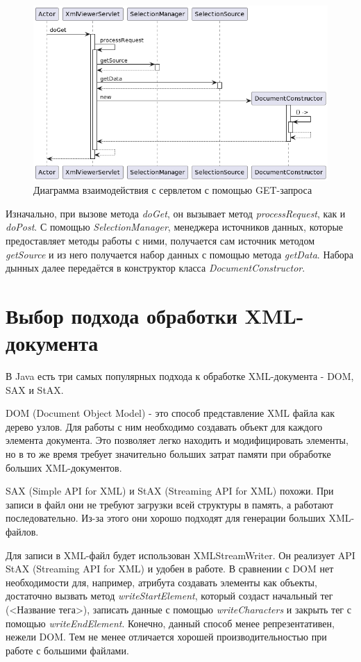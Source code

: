 \documentclass[a4paper,12pt]{diplom}
\begin{document}
\begin{figure}[h!]
	\centering
	\includegraphics[width=\textwidth]{imgs/usingservlet.png}
	\caption{Диаграмма взаимодействия с сервлетом с помощью GET-запроса}
	\label{fig:interactionServl}
\end{figure}

Изначально, при вызове метода \textit{doGet}, он вызывает метод \textit{processRequest}, как и \textit{doPost}. С помощью \textit{SelectionManager}, менеджера источников данных, которые предоставляет методы работы с ними, получается сам источник методом \textit{getSource} и из него получается набор данных с помощью метода \textit{getData}. Набора дынных далее передаётся в конструктор класса \textit{DocumentConstructor}.

\section{Выбор подхода обработки XML-документа}

В Java есть три самых популярных подхода к обработке XML-документа - DOM, SAX и StAX.

DOM (Document Object Model) - это способ представление XML файла как дерево узлов. Для работы с ним необходимо создавать объект для каждого элемента документа. Это позволяет легко находить и модифицировать элементы, но в то же время требует значительно больших затрат памяти при обработке больших XML-документов.

SAX (Simple API for XML) и StAX (Streaming API for XML) похожи. При записи в файл они не требуют загрузки всей структуры в память, а работают последовательно. Из-за этого они хорошо подходят для генерации больших XML-файлов. 

Для записи в XML-файл будет использован XMLStreamWriter. Он реализует API StAX (Streaming API for XML) и удобен в работе. В сравнении с DOM нет необходимости для, например, атрибута создавать элементы как объекты, достаточно вызвать метод \textit{writeStartElement}, который создаст начальный тег (<Название тега>), записать данные с помощью \textit{writeCharacters} и закрыть тег с помощью \textit{writeEndElement}. Конечно, данный способ менее репрезентативен, нежели DOM. Тем не менее отличается хорошей производительностью при работе с большими файлами. 
\end{document}
